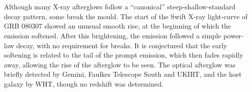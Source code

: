 \section*{}
Although many X‐ray afterglows follow a “canonical” steep‐shallow‐standard decay pattern, some break the mould. The start of the Swift X‐ray light‐curve of GRB 080307 showed an unusual smooth rise, at the beginning of which the emission softened. After this brightening, the emission followed a simple power‐law decay, with no requirement for breaks. It is conjectured that the early softening is related to the tail of the prompt emission, which then fades rapidly away, allowing the rise of the afterglow to be seen. The optical afterglow was briefly detected by Gemini, Faulkes Telescope South and UKIRT, and the host galaxy by WHT, though no redshift was determined.
